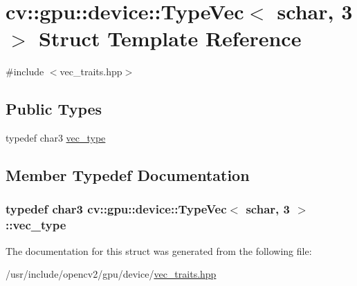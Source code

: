 \hypertarget{structcv_1_1gpu_1_1device_1_1TypeVec_3_01schar_00_013_01_4}{\section{cv\-:\-:gpu\-:\-:device\-:\-:Type\-Vec$<$ schar, 3 $>$ Struct Template Reference}
\label{structcv_1_1gpu_1_1device_1_1TypeVec_3_01schar_00_013_01_4}
}


{\ttfamily \#include $<$vec\-\_\-traits.\-hpp$>$}

\subsection*{Public Types}
\begin{DoxyCompactItemize}
\item 
typedef char3 \hyperlink{structcv_1_1gpu_1_1device_1_1TypeVec_3_01schar_00_013_01_4_a7e2bca2584f88e6a3d50c461cd2f9e19}{vec\-\_\-type}
\end{DoxyCompactItemize}


\subsection{Member Typedef Documentation}
\hypertarget{structcv_1_1gpu_1_1device_1_1TypeVec_3_01schar_00_013_01_4_a7e2bca2584f88e6a3d50c461cd2f9e19}{
\subsubsection[{vec\-\_\-type}]{\setlength{\rightskip}{0pt plus 5cm}typedef char3 {\bf cv\-::gpu\-::device\-::\-Type\-Vec}$<$ {\bf schar}, 3 $>$\-::{\bf vec\-\_\-type}}}\label{structcv_1_1gpu_1_1device_1_1TypeVec_3_01schar_00_013_01_4_a7e2bca2584f88e6a3d50c461cd2f9e19}


The documentation for this struct was generated from the following file\-:\begin{DoxyCompactItemize}
\item 
/usr/include/opencv2/gpu/device/\hyperlink{vec__traits_8hpp}{vec\-\_\-traits.\-hpp}\end{DoxyCompactItemize}
